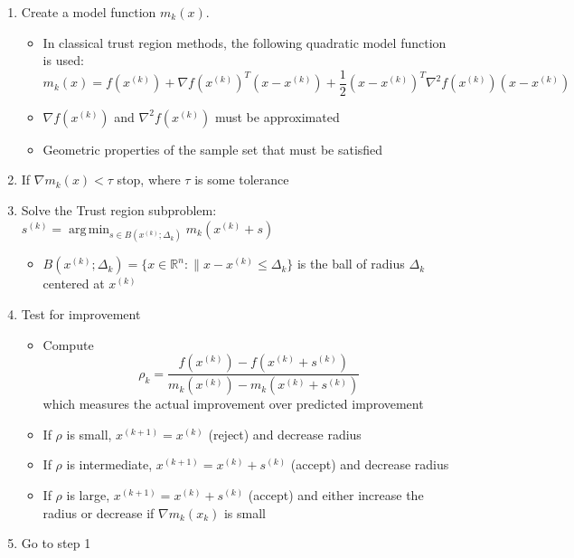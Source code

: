 \documentclass{article}
\DeclareMathOperator*{\argmin}{arg\,min}
\begin{document}
\begin{enumerate}
	\item Create a model function $m_k(x)$.
	\begin {itemize}
		\item In classical trust region methods, the following quadratic model function is used:
		\[
		m_k(x) = f(x^{(k)}) + \nabla f(x^{(k)})^T (x-x^{(k)}) + \frac 1 2 (x-x^{(k)})^T\nabla^2f(x^{(k)})(x-x^{(k)})
		\]
	\end{itemize}
	\begin{itemize}
		\item $\nabla f(x^{(k)})$ and $\nabla^2 f(x^{(k)})$ must be approximated
		\item Geometric properties of the sample set that must be satisfied
	\end{itemize}
	
	\item If $\nabla m_k(x) < \tau$ stop, where $\tau$ is some tolerance
	
	\item Solve the Trust region subproblem: $s^{(k)} = \argmin_{s\in B(x^{(k)};\Delta_k)} m_k(x^{(k)} + s)$
	\begin {itemize}
		\item $B(x^{(k)};\Delta_k) = \{ x \in \mathbb{R}^n : \| x - x^{(k)} \le \Delta_k \}$ 
		is the ball of radius $\Delta_k$ centered at $x^{(k)}$
	\end{itemize}
	
	\item Test for improvement
	\begin{itemize}
		\item Compute
\begin{equation}
\label{rho}
\rho_k = \frac{f(x^{(k)}) - f(x^{(k)}+s^{(k)})}{m_k(x^{(k)}) - m_k(x^{(k)}+s^{(k)})}
\end{equation}
which measures the actual improvement over predicted improvement
		\item If $\rho$ is small, $x^{(k+1)}=x^{(k)}$ (reject) and decrease radius
		\item If $\rho$ is intermediate, $x^{(k+1)}=x^{(k)}+s^{(k)}$ (accept) and decrease radius
		\item If $\rho$ is large, $x^{(k+1)}=x^{(k)}+s^{(k)}$ (accept) and either increase the radius or decrease if $\nabla m_k(x_k)$ is small
	\end{itemize}
	
	\item Go to step 1
\end{enumerate}
\end{document}
